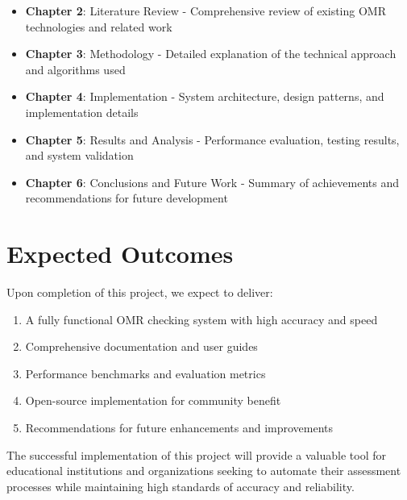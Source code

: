 \begin{itemize}
\item \textbf{Chapter 2}: Literature Review - Comprehensive review of existing OMR technologies and related work
\item \textbf{Chapter 3}: Methodology - Detailed explanation of the technical approach and algorithms used
\item \textbf{Chapter 4}: Implementation - System architecture, design patterns, and implementation details
\item \textbf{Chapter 5}: Results and Analysis - Performance evaluation, testing results, and system validation
\item \textbf{Chapter 6}: Conclusions and Future Work - Summary of achievements and recommendations for future development
\end{itemize}

\section{Expected Outcomes}

Upon completion of this project, we expect to deliver:

\begin{enumerate}
\item A fully functional OMR checking system with high accuracy and speed
\item Comprehensive documentation and user guides
\item Performance benchmarks and evaluation metrics
\item Open-source implementation for community benefit
\item Recommendations for future enhancements and improvements
\end{enumerate}

The successful implementation of this project will provide a valuable tool for educational institutions and organizations seeking to automate their assessment processes while maintaining high standards of accuracy and reliability.